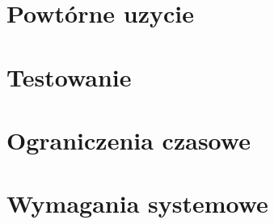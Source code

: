 \documentclass[a4paper,titlepage,10pt]{article}
\begin{document}
	\section{Powtórne uzycie}\label{sec:powtorne uzycie}
	
	\section{Testowanie}\label{sec:testy}
	
	\section{Ograniczenia czasowe}\label{sec:ograniczenia czasowe}
	
	\section{Wymagania systemowe}\label{sec:wymagania systemowe}
	
\end{document}
